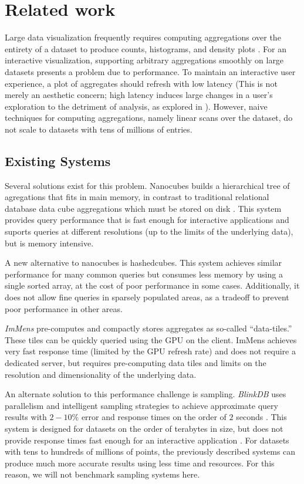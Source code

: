 \documentclass[journal]{vgtc}                %
\begin{document}
\section{Related work}
Large data visualization frequently requires computing aggregations over the
entirety of a dataset to produce counts, histograms, and density plots
\cite{?}. For an interactive visualization, supporting arbitrary aggregations
smoothly on large datasets presents a problem due to performance. To maintain
an interactive user experience, a plot of aggregates should refresh with low
latency (This is not merely an aesthetic concern; high latency induces large
changes in a user's exploration to the detriment of analysis, as explored in
\cite{2014-latency} ). However, naive techniques
for computing aggregations, namely linear scans over the dataset, do not scale
to datasets with tens of millions of entries.

\subsection{Existing Systems}

Several solutions exist for this problem. Nanocubes builds a
hierarchical tree of agregations that fits in main memory, in contrast to
traditional relational database data cube aggregations which must be stored on
disk \cite{nanocubes}. This system provides query performance that is fast
enough for interactive applications and suports queries at different
resolutions (up to the limits of the underlying data), but is memory intensive.

A new alternative to nanocubes is hashedcubes. This system
achieves similar performance for many common queries but consumes less memory
by using a single sorted array, at the cost of poor performance in some cases.
Additionally, it does not allow fine queries in sparsely populated areas, as a
tradeoff to prevent poor performance in other areas.

\textit{ImMens} pre-computes and compactly stores aggregates as so-called
``data-tiles.'' These tiles can be quickly queried using the GPU on the client.
ImMens achieves very fast response time (limited by the GPU refresh
rate) and does not require a dedicated server, but requires pre-computing data
tiles and limits on the resolution and dimensionality of the underlying data.

An alternate solution to this performance challenge is sampling.
\textit{BlinkDB} uses parallelism and intelligent sampling strategies to
achieve approximate query results with $2-10\%$ error and response times on the
order of $2$ seconds \cite{blinkdb}. This system is designed for datasets on
the order of terabytes in size, but does not provide response times fast enough
for an interactive application . For datasets with tens to hundreds of millions of
points, the previously described systems can produce much more accurate results
using less time and resources. For this reason, we will not benchmark sampling
systems here. 
\end{document}
